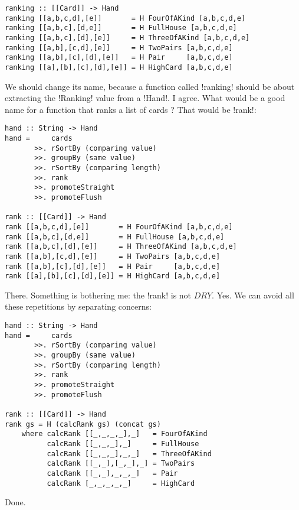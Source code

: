 \begin{lstlisting}[frame=single]
ranking :: [[Card]] -> Hand
ranking [[a,b,c,d],[e]]       = H FourOfAKind [a,b,c,d,e]
ranking [[a,b,c],[d,e]]       = H FullHouse [a,b,c,d,e]
ranking [[a,b,c],[d],[e]]     = H ThreeOfAKind [a,b,c,d,e]
ranking [[a,b],[c,d],[e]]     = H TwoPairs [a,b,c,d,e]
ranking [[a,b],[c],[d],[e]]   = H Pair     [a,b,c,d,e]
ranking [[a],[b],[c],[d],[e]] = H HighCard [a,b,c,d,e] 
\end{lstlisting}
\lhN We should change its name, because a function called \il!ranking! should be about extracting the \il!Ranking! value from a \il!Hand!. 
\lhA I agree.
\lhN What would be a good name for a function that ranks a list of cards ?
\lhA That would be \il!rank!:
\begin{lstlisting}[frame=single]
hand :: String -> Hand
hand =     cards
       >>. rSortBy (comparing value)
       >>. groupBy (same value)
       >>. rSortBy (comparing length)
       >>. rank
       >>. promoteStraight
       >>. promoteFlush    

rank :: [[Card]] -> Hand
rank [[a,b,c,d],[e]]       = H FourOfAKind [a,b,c,d,e]
rank [[a,b,c],[d,e]]       = H FullHouse [a,b,c,d,e]
rank [[a,b,c],[d],[e]]     = H ThreeOfAKind [a,b,c,d,e]
rank [[a,b],[c,d],[e]]     = H TwoPairs [a,b,c,d,e]
rank [[a,b],[c],[d],[e]]   = H Pair     [a,b,c,d,e]
rank [[a],[b],[c],[d],[e]] = H HighCard [a,b,c,d,e] 
\end{lstlisting}
\success There.
\newpage \lhN Something is bothering me: the \il!rank! is not $DRY$.
\lhA Yes. We can avoid all these repetitions by separating concerns:
\begin{lstlisting}[frame=single]
hand :: String -> Hand
hand =     cards
       >>. rSortBy (comparing value)
       >>. groupBy (same value)
       >>. rSortBy (comparing length)
       >>. rank
       >>. promoteStraight
       >>. promoteFlush    

rank :: [[Card]] -> Hand
rank gs = H (calcRank gs) (concat gs)  
    where calcRank [[_,_,_,_],_]   = FourOfAKind 
          calcRank [[_,_,_],_]     = FullHouse
          calcRank [[_,_,_],_,_]   = ThreeOfAKind
          calcRank [[_,_],[_,_],_] = TwoPairs
          calcRank [[_,_],_,_,_]   = Pair    
          calcRank [_,_,_,_,_]     = HighCard 
\end{lstlisting}
\success Done.
\lhend
